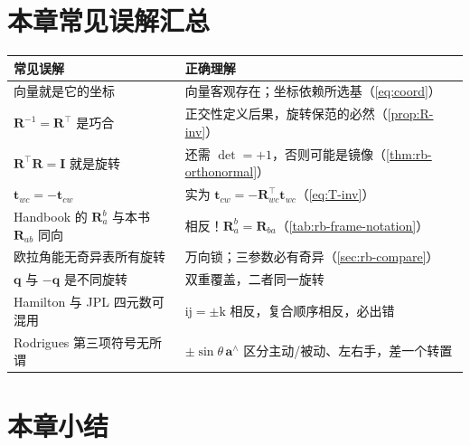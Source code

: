 \section*{本章常见误解汇总}
\begin{table}[H]\centering\small
\begin{tabular}{p{} p{}}
\toprule
\textbf{常见误解} & \textbf{正确理解} \\
\midrule
向量就是它的坐标 & 向量客观存在；坐标依赖所选基（\cref{eq:coord}）\\
$\mathbf{R}^{-1}=\mathbf{R}^\top$ 是巧合 & 正交性定义后果，旋转保范的必然（\cref{prop:R-inv}）\\
$\mathbf{R}^\top\mathbf{R}=\mathbf{I}$ 就是旋转 & 还需 $\det=+1$，否则可能是镜像（\cref{thm:rb-orthonormal}）\\
$\mathbf{t}_{wc}=-\mathbf{t}_{cw}$ & 实为 $\mathbf{t}_{cw}=-\mathbf{R}_{wc}^\top\mathbf{t}_{wc}$（\cref{eq:T-inv}）\\
Handbook 的 $\mathbf{R}_a^b$ 与本书 $\mathbf{R}_{ab}$ 同向 & 相反！$\mathbf{R}_a^b=\mathbf{R}_{ba}$（\cref{tab:rb-frame-notation}）\\
欧拉角能无奇异表所有旋转 & 万向锁；三参数必有奇异（\cref{sec:rb-compare}）\\
$\mathbf{q}$ 与 $-\mathbf{q}$ 是不同旋转 & 双重覆盖，二者同一旋转 \\
Hamilton 与 JPL 四元数可混用 & $\mathrm{ij}=\pm\mathrm{k}$ 相反，复合顺序相反，必出错 \\
Rodrigues 第三项符号无所谓 & $\pm\sin\theta\,\mathbf{a}^\wedge$ 区分主动/被动、左右手，差一个转置 \\
\bottomrule
\end{tabular}
\end{table}

\section*{本章小结}

